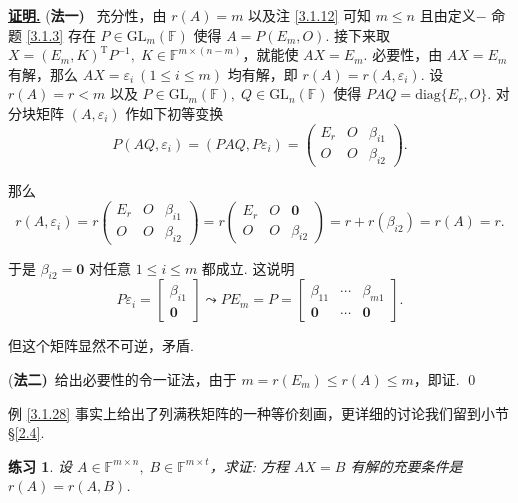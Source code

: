 \documentclass[10pt,openany]{article}
\theoremstyle{thmstyle} %
\newtheorem{practice}{练习}[section]
\theoremstyle{defstyle} %
\theoremstyle{prostyle} %
\theoremstyle{exastyle}
\theoremstyle{remstyle}
\renewenvironment{proof}[1][证明]{\par\underline{\textbf{#1.}} \;\fangsong}{\qed\par}
\newcommand{\T}{^{\text{T}}}
\newcommand{\F}{\mathbb{F}}
\newcommand{\gfn}{\text{GL}_n(\mathbb{F})}
\newcommand{\gfm}{\text{GL}_m(\mathbb{F})}
\newcommand{\mn}{^{m \times n}}
\newcommand{\diag}{\mathrm{diag}}
\begin{document}
\begin{proof}
	(\textbf{法一)} \ 充分性，由 \( r(A)=m \) 以及注 \ref{3.1.12} 可知 \( m \leq n \) 且由定义\(-\) 命题 \ref{3.1.3} 存在 \( P \in \gfm \) 使得 \( A=P(E_m,O) \). 接下来取 \( X=(E_m,K)\T P^{-1}, \; K \in \F^{m \times (n-m)} \)，就能使 \( AX=E_m \). 必要性，由 \( AX = E_m \) 有解，那么 \( AX=\varepsilon_i \ (1 \leq i \leq m ) \) 均有解，即 \( r(A)=r(A,\varepsilon_i) \). 设 \( r(A)=r < m \) 以及 \( P \in \gfm, \; Q \in \gfn  \) 使得 \( PAQ=\diag\{E_r,O\} \). 对分块矩阵 \( (A,\varepsilon_i) \) 作如下初等变换
	\[ P(AQ,\varepsilon_i)=(PAQ,P\varepsilon_i)= \begin{pmatrix}
		E_r & O & \beta_{i1} \\
		O & O & \beta_{i2}
	\end{pmatrix}. \] 
	
	那么
	\[ r(A,\varepsilon_i)=r\begin{pmatrix}
		E_r & O & \beta_{i1} \\
		O & O & \beta_{i2}
	\end{pmatrix}=r\begin{pmatrix}
		E_r & O & \bm{0} \\
		O & O & \beta_{i2}
	\end{pmatrix}=r+r(\beta_{i2})=r(A)=r. \]
	
	于是 \( \beta_{i2}=\bm{0} \) 对任意 \( 1 \leq i \leq m \) 都成立. 这说明
	\[ P\varepsilon_i=\begin{bmatrix}
		\beta_{i1} \\ \bm{0}
	\end{bmatrix} \leadsto PE_m=P=\begin{bmatrix}
	 \beta_{11} & \cdots & \beta_{m1} \\
	 \bm{0} & \cdots & \bm{0}
	\end{bmatrix}. \]
	
	但这个矩阵显然不可逆，矛盾.
    
    \vspace{1ex}
    
    (\textbf{法二)}\ 给出必要性的令一证法，由于 \( m=r(E_m) \leq r(A) \leq m \)，即证. 
\end{proof}

例 \ref{3.1.28} 事实上给出了列满秩矩阵的一种等价刻画，更详细的讨论我们留到小节 \S \ref{2.4}.

\begin{practice}
	设 \( A \in \F\mn, \; B \in \F^{m \times t} \)，求证: 方程 \( AX = B \) 有解的充要条件是 \( r(A) = r(A,B) \).
\end{practice}
\end{document}
